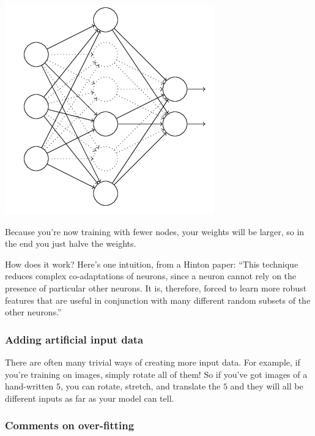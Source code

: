 \documentclass[12pt]{article}
\begin{document}
\includegraphics[scale=0.8]{dropout}

Because you're now training with fewer nodes, your weights will be larger, so in the end you just halve the weights.


How does it work? Here's one intuition, from a Hinton paper: ``This technique reduces complex co-adaptations of neurons, since a neuron cannot rely on the presence of particular other neurons. It is, therefore, forced to learn more robust features that are useful in conjunction with many different random subsets of the other neurons.''

\subsubsection*{Adding artificial input data}

There are often many trivial ways of creating more input data. For example, if you're training on images, simply rotate all of them! So if you've got images of a hand-written $5$, you can rotate, stretch, and translate the $5$ and they will all be different inputs as far as your model can tell.

\subsubsection*{Comments on over-fitting}
\end{document}
